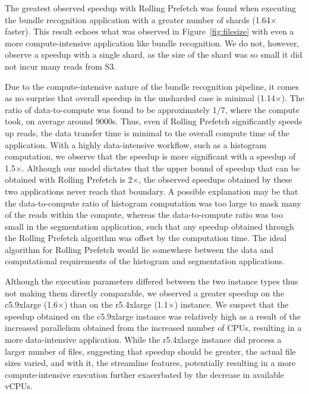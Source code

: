 \documentclass[conference]{IEEEtran}
\begin{document}
The greatest observed speedup with Rolling Prefetch was found when executing the bundle recognition application
with a greater number of shards (1.64$\times$ faster). This result echoes what was observed in Figure~\ref{fig:filesize} with even a more compute-intensive application like 
bundle recognition. We do not, however, observe a speedup with a single shard, as the size of the shard was so small it did not incur many reads from S3.

Due to the compute-intensive nature of the bundle recognition pipeline, it comes as no
surprise that overall speedup in the unsharded case is minimal (1.14$\times$). The ratio of data-to-compute was found to be approximately 1/7, where the compute took, on average around 9000s. Thus, even if Rolling Prefetch significantly speeds up reads, the data transfer time is
minimal to the overall compute time of the application. With a highly data-intensive
workflow, such as a histogram computation, we observe that the speedup is more
significant with a speedup of 1.5$\times$. Although our model dictates that the upper bound
of speedup that can be obtained with Rolling Prefetch is 2$\times$, the observed speedups
obtained by these two applications never reach that boundary. A possible explanation may be that the data-to-compute ratio of histogram computation was too large to mask many of
the reads within the compute, whereas the data-to-compute ratio was too small in the segmentation application, such that any speedup obtained
through the Rolling Prefetch algorithm was offset by the computation time. The ideal
algorithm for Rolling Prefetch would lie somewhere between the data and computational
requirements of the histogram and segmentation applications.

Although the execution parameters differed between the two instance types thus not
making them directly comparable, we observed a greater speedup on the c5.9xlarge
(1.6$\times$) than on the r5.4xlarge (1.1$\times$) instance. We suspect that the speedup obtained
on the c5.9xlarge instance was relatively high as a result of the increased parallelism
obtained from the increased number of CPUs, resulting in a more data-intensive application. While the r5.4xlarge instance did process a larger number of files, 
suggesting that speedup should be greater, the actual file sizes varied, and with
it, the streamline features, potentially resulting in a more compute-intensive
execution further exacerbated by the decrease in available vCPUs. 
\end{document}
